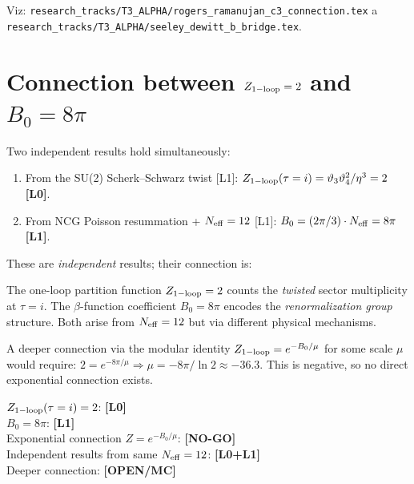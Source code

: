 \documentclass[12pt,a4paper]{article}
\begin{document}
Viz: \texttt{research\_tracks/T3\_ALPHA/rogers\_ramanujan\_c3\_connection.tex}
a \texttt{research\_tracks/T3\_ALPHA/seeley\_dewitt\_b\_bridge.tex}.

\section{Connection between $Z_{\rm 1-loop}=2$ and $B_0=8\pi$}
\label{sec:Z-B0-connection}

Two independent results hold simultaneously:
\begin{enumerate}
\item From the SU(2) Scherk--Schwarz twist [L1]:
  $Z_{\rm 1-loop}(\tau=i) = \vartheta_3\vartheta_4^2/\eta^3 = 2$
  \textbf{[L0]}.

\item From NCG Poisson resummation + $N_{\rm eff}=12$ [L1]:
  $B_0 = (2\pi/3)\cdot N_{\rm eff} = 8\pi$ \textbf{[L1]}.
\end{enumerate}

These are \emph{independent} results; their connection is:

The one-loop partition function $Z_{\rm 1-loop}=2$ counts
the \emph{twisted} sector multiplicity at $\tau=i$.
The $\beta$-function coefficient $B_0=8\pi$ encodes the
\emph{renormalization group} structure.
Both arise from $N_{\rm eff}=12$ but via different physical mechanisms.

A deeper connection via the modular identity
$Z_{\rm 1-loop} = e^{-B_0/\mu}$ for some scale $\mu$ would require:
$2 = e^{-8\pi/\mu} \Rightarrow \mu = -8\pi/\ln 2 \approx -36.3$.
This is negative, so no direct exponential connection exists.

\begin{statusbox}
$Z_{\rm 1-loop}(\tau=i) = 2$: \textbf{[L0]}\\
$B_0 = 8\pi$: \textbf{[L1]}\\
Exponential connection $Z = e^{-B_0/\mu}$: \textbf{[NO-GO]}\\
Independent results from same $N_{\rm eff}=12$: \textbf{[L0+L1]}\\
Deeper connection: \textbf{[OPEN/MC]}
\end{statusbox}
\end{document}
